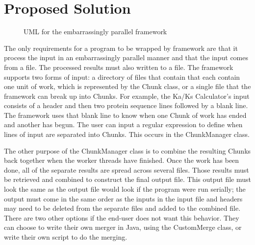 \documentclass[12pt]{article}
\begin{document}
\section{Proposed Solution}
\begin{figure}
{}
\caption{UML for the embarrassingly parallel framework}
\label{fig:uml}
\end{figure}
The only requirements for a program to be wrapped by framework are that it 
process the input in an embarrassingly parallel manner and that the input comes 
from a file. The processed results must also written to a file. The framework 
supports two forms of input: a directory of files that contain that each contain
one unit of work, which is represented by the Chunk class, or a single file that
the framework can break up into Chunks. For example, the Ka/Ks Calculator's 
input consists of a header and then two protein sequence lines followed by a 
blank line. The framework uses that blank line to know when one Chunk of work 
has ended and another has begun. The user can input a regular expression to 
define when lines of input are separated into Chunks. This occurs in the 
ChunkManager class. 

The other purpose of the ChunkManager class is to combine the resulting Chunks 
back together when the worker threads have finished. Once the work has been
done, all of the separate results are spread across several files. Those results 
must be retrieved and combined to construct the final output file. This output 
file must look the same as the output file would look if the program were run 
serially; the output must come in the same order as the inputs in the input file
and headers may need to be deleted from the separate files and added to the 
combined file. There are two other options if the end-user does not want this 
behavior. They can choose to write their own merger in Java, using the 
CustomMerge class, or write their own script to do the merging. 
\end{document}
